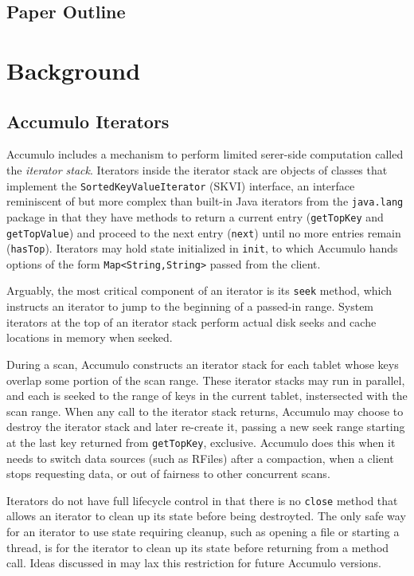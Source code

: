 \subsection{Paper Outline}



\section{Background}
\label{sBackground}







\subsection{Accumulo Iterators}
Accumulo includes a mechanism to perform limited serer-side computation called the 
\emph{iterator stack}.  Iterators inside the iterator stack are objects of classes
that implement the \texttt{SortedKeyValueIterator} (SKVI) interface, an interface
reminiscent of but more complex than built-in Java iterators from the \texttt{java.lang} package
in that they have methods to return a current entry (\texttt{getTopKey} and \texttt{getTopValue})
and proceed to the next entry (\texttt{next}) until no more entries remain (\texttt{hasTop}).
Iterators may hold state initialized in \texttt{init}, to which Accumulo hands 
options of the form \texttt{Map<String,String>} passed from the client.%

Arguably, the most critical component of an iterator is its \texttt{seek} method,
which instructs an iterator to jump to the beginning of a passed-in range. System iterators 
at the top of an iterator stack perform actual disk seeks and cache locations in memory when seeked.

During a scan, Accumulo constructs an iterator stack for each tablet whose keys overlap some portion 
of the scan range. These iterator stacks may run in parallel, and each is seeked to the range of 
keys in the current tablet, instersected with the scan range. When any call to the iterator stack 
returns, Accumulo may choose to destroy the iterator stack and later re-create it,
passing a new seek range starting at the last key returned from \texttt{getTopKey}, exclusive.
Accumulo does this when it needs to switch data sources (such as RFiles) after a compaction, 
when a client stops requesting data, or out of fairness to other concurrent scans.

Iterators do not have full lifecycle control in that there is no \texttt{close} method 
that allows an iterator to clean up its state before being destroyted. The only safe way for an 
iterator to use state requiring cleanup, such as opening a file or starting a thread,
is for the iterator to clean up its state before returning from a method call.
Ideas discussed in \cite{ACCUMULO-3751} may lax this restriction for future Accumulo versions.


